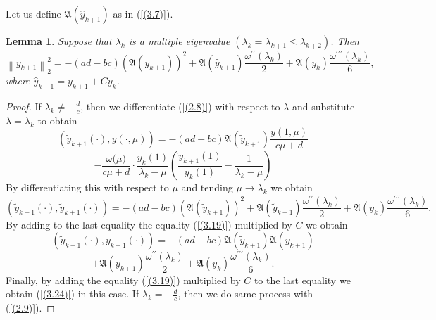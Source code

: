 \documentclass[pdflatex,sn-mathphys-num]{sn-jnl}%
\theoremstyle{thmstyleone}%
\theoremstyle{thmstyletwo}%
\theoremstyle{thmstylethree}%
\newtheorem{lem}[thm]{Lemma}
\theoremstyle{definition}
\theoremstyle{remark}
\numberwithin{equation}{section}
\begin{document}
Let us define 
$\mathfrak{A}(\hat{y}_{k+1})$ as in (\ref{(3.7)}).

\begin{lem} Suppose that  $\lambda _{k}$ is a multiple eigenvalue \((\lambda_{k}=\lambda_{k+1} \le\lambda_{k+2})\).
Then 
\begin{equation}
{\left\| {y_{k+1}} \right\|}^{2}_{2} = - (ad - bc)(\mathfrak{A}(y_{k+1}))^2+\mathfrak{A}(\hat{y}_{k+1})\frac{\omega^{\prime\prime}(\lambda_k)}{2}+\mathfrak{A}(y_k)\frac{\omega^{\prime\prime\prime}(\lambda_k)}{6}, \label{(3.24)}
\end{equation}
where $\hat{y}_{k+1}={y}_{k+1}+Cy_k$.
\end{lem}

\begin{proof}
If $\lambda_k\neq-\frac{d}{c}$, then we differentiate (\ref{(2.8)}) with respect to $\lambda$ and substitute $\lambda=\lambda_k$ to obtain 
$$
\left(\tilde{y}_{k+1}(\cdot), y(\cdot,\mu)\right)
= -(ad - bc)\mathfrak{A}(\tilde{y}_{k+1})\frac{{y(1,\mu)}}{c{\mu} + d}
$$
\begin{equation}
- \frac{\omega{(\mu})}{{c\mu+d}} \cdot \frac{y_k(1)}{\lambda_k-{\mu}}\left(\frac{{\tilde{y}_{k+1}(1)}}{y_k(1)}-\frac{1}{\lambda_k-{\mu}} \right)
\label{(3.25)}
\end{equation}
By differentiating this with respect to $\mu$ and tending $\mu\to\lambda_k$ we obtain
\begin{equation}
\left(\tilde{y}_{k+1}(\cdot),\tilde{y}_{k+1}(\cdot)\right)
= -(ad - bc)(\mathfrak{A}(\tilde{y}_{k+1}))^2+\mathfrak{A}(\tilde{y}_{k+1})\frac{\omega^{\prime\prime}(\lambda_k)}{2}+\mathfrak{A}(y_k)\frac{\omega^{\prime\prime\prime}(\lambda_k)}{6}.\label{(3.26)}
\end{equation}
By adding to the last equality the equality (\ref{(3.19)}) multiplied by $C$ we obtain 
$$
\left(\tilde{y}_{k+1}(\cdot),{y}_{k+1}(\cdot)\right)
= -(ad - bc)\mathfrak{A}(\tilde{y}_{k+1})\mathfrak{A}({y}_{k+1})
$$
\begin{equation}
+\mathfrak{A}({y}_{k+1})\frac{\omega^{\prime\prime}(\lambda_k)}{2}+\mathfrak{A}(y_k)\frac{\omega^{\prime\prime\prime}(\lambda_k)}{6}.\label{(3.27)}
\end{equation}
Finally, by adding the equality (\ref{(3.19)}) multiplied by $C$  to the last equality we obtain (\ref{(3.24)}) in this case. If $\lambda_k=-\frac{d}{c}$, then we do same process with (\ref{(2.9)}).
\end{proof}
\end{document}
